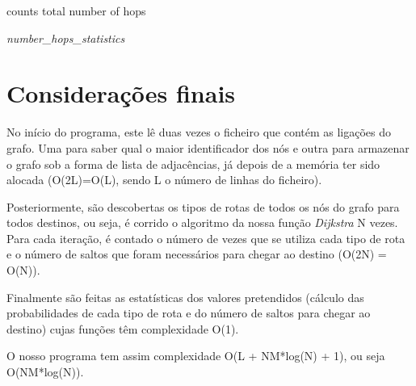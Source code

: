 \documentclass[a4paper]{article}
\begin{document}
\begin{algorithm}[H]
 counts total number of hops\;
 
 
 \caption{\textit{number\_hops\_statistics}}
\end{algorithm}

\section{Considerações finais}
No início do programa, este lê duas vezes o ficheiro que contém as ligações do grafo. Uma para saber qual o maior identificador dos nós e outra para armazenar o grafo sob a forma de lista de adjacências, já depois de a memória ter sido alocada (O(2L)=O(L), sendo L o número de linhas do ficheiro).

Posteriormente, são descobertas os tipos de rotas de todos os nós do grafo para todos destinos, ou seja, é corrido o algoritmo da nossa função \textit{Dijkstra} N vezes. Para cada iteração, é contado o número de vezes que se utiliza cada tipo de rota e o número de saltos que foram necessários para chegar ao destino (O(2N) = O(N)).

Finalmente são feitas as estatísticas dos valores pretendidos (cálculo das probabilidades de cada tipo de rota e do número de saltos para chegar ao destino) cujas funções têm complexidade O(1).

O nosso programa tem assim complexidade O(L + NM*log(N) + 1), ou seja O(NM*log(N)).
\end{document}
